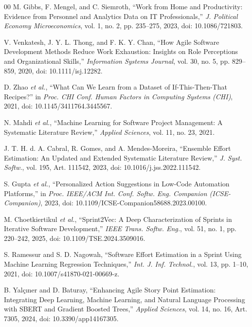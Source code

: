 \documentclass[conference]{IEEEtran}
\begin{document}
\begin{thebibliography}{00}
M. Gibbs, F. Mengel, and C. Siemroth, ``Work from Home and Productivity: Evidence from Personnel and Analytics Data on IT Professionals,''
\textit{J. Political Economy Microeconomics}, vol. 1, no. 2, pp. 235--275, 2023,
doi: 10.1086/721803.

V. Venkatesh, J. Y. L. Thong, and F. K. Y. Chan, ``How Agile Software Development Methods Reduce Work Exhaustion: Insights on Role Perceptions and Organizational Skills,''
\textit{Information Systems Journal}, vol. 30, no. 5, pp. 829--859, 2020,
doi: 10.1111/isj.12282.

D. Zhao \textit{et al.}, ``What Can We Learn from a Dataset of If-This-Then-That Recipes?''
in \textit{Proc. CHI Conf. Human Factors in Computing Systems (CHI)}, 2021,
doi: 10.1145/3411764.3445567.

N. Mahdi \textit{et al.}, ``Machine Learning for Software Project Management: A Systematic Literature Review,''
\textit{Applied Sciences}, vol. 11, no. 23, 2021.

J. T. H. d. A. Cabral, R. Gomes, and A. Mendes-Moreira,
``Ensemble Effort Estimation: An Updated and Extended Systematic Literature Review,''
\textit{J. Syst. Softw.}, vol. 195, Art. 111542, 2023,
doi: 10.1016/j.jss.2022.111542.


S. Gupta \textit{et al.}, ``Personalized Action Suggestions in Low-Code Automation Platforms,''
in \textit{Proc. IEEE/ACM Int. Conf. Softw. Eng. Companion (ICSE-Companion)}, 2023,
doi: 10.1109/ICSE-Companion58688.2023.00100.

M. Choetkiertikul \textit{et al.},
``Sprint2Vec: A Deep Characterization of Sprints in Iterative Software Development,''
\textit{IEEE Trans. Softw. Eng.}, vol. 51, no. 1, pp. 220--242, 2025,
doi: 10.1109/TSE.2024.3509016.

S. Ramessur and S. D. Nagowah,
``Software Effort Estimation in a Sprint Using Machine Learning Regression Techniques,''
\textit{Int. J. Inf. Technol.}, vol. 13, pp. 1--10, 2021,
doi: 10.1007/s41870-021-00669-z.

B. Yal\c{c}{\i}ner and D. Baturay,
``Enhancing Agile Story Point Estimation: Integrating Deep Learning, Machine Learning, and Natural Language Processing with SBERT and Gradient Boosted Trees,''
\textit{Applied Sciences}, vol. 14, no. 16, Art. 7305, 2024,
doi: 10.3390/app14167305.


\end{thebibliography}
\end{document}
